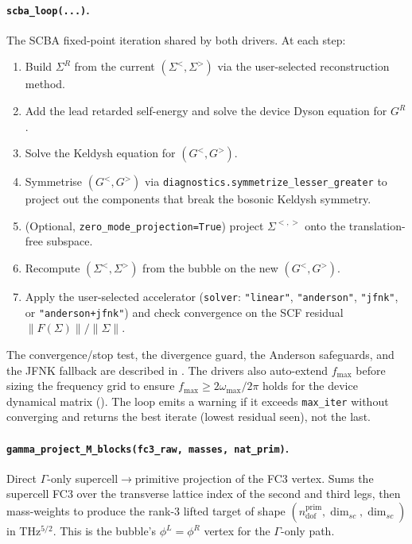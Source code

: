 \paragraph{\texttt{scba\_loop(...)}.}  The SCBA fixed-point iteration
shared by both drivers.  At each step:
\begin{enumerate}
  \item Build $\Sigma^R$ from the current $(\Sigma^<, \Sigma^>)$ via
        the user-selected reconstruction method.
  \item Add the lead retarded self-energy and solve the device Dyson
        equation for $G^R$.
  \item Solve the Keldysh equation for $(G^<, G^>)$.
  \item Symmetrise $(G^<, G^>)$ via
        \texttt{diagnostics.symmetrize\_lesser\_greater} to project
        out the components that break the bosonic Keldysh symmetry.
  \item (Optional, \texttt{zero\_mode\_projection=True}) project
        $\Sigma^{<,>}$ onto the translation-free subspace.
  \item Recompute $(\Sigma^<, \Sigma^>)$ from the bubble on the new
        $(G^<, G^>)$.
  \item Apply the user-selected accelerator
        (\texttt{solver}: \texttt{"linear"}, \texttt{"anderson"},
        \texttt{"jfnk"}, or \texttt{"anderson+jfnk"}) and check
        convergence on the SCF residual
        $\|F(\Sigma)\|/\|\Sigma\|$.
\end{enumerate}
The convergence/stop test, the divergence guard, the Anderson
safeguards, and the JFNK fallback are described in
. The drivers also auto-extend
$f_{\max}$ before sizing the frequency grid to ensure
$f_{\max}\ge 2\omega_{\max}/2\pi$ holds for the device dynamical
matrix (). The loop emits a warning
if it exceeds \texttt{max\_iter} without converging and returns the
best iterate (lowest residual seen), not the last.

\paragraph{\texttt{gamma\_project\_M\_blocks(fc3\_raw, masses,
nat\_prim)}.}  Direct $\Gamma$-only supercell$\to$primitive
projection of the FC3 vertex.  Sums the supercell FC3 over the
transverse lattice index of the second and third legs, then
mass-weights to produce the rank-3 lifted target of shape
$(n_\mathrm{dof}^\mathrm{prim}, \dim_{sc}, \dim_{sc})$ in THz$^{5/2}$.
This is the bubble's $\phi^L = \phi^R$ vertex for the $\Gamma$-only
path.

